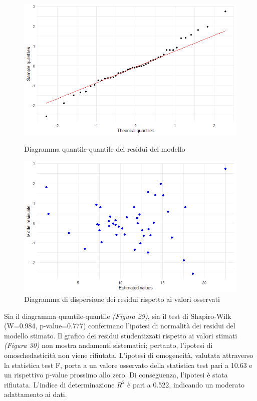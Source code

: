 \documentclass{article} %
\begin{document}
\begin{figure}[H]
    \centering
    \begin{minipage}{0.49\textwidth}
        \centering
        \includegraphics[width=\textwidth]{immagini/qq_lm.png}
        \captionsetup{justification=centering}
        \caption{Diagramma quantile-quantile dei residui del modello}
    \end{minipage}
    \hfill
    \begin{minipage}{0.49\textwidth}
        \centering
        \includegraphics[width=\textwidth]{immagini/res_lm.png}
        \captionsetup{justification=centering}
        \caption{Diagramma di dispersione dei residui rispetto ai valori osservati}
    \end{minipage}
\end{figure}

Sia il diagramma quantile-quantile \textit{(Figura 29)}, sia il test di Shapiro-Wilk (W=0.984, p-value=0.777) confermano l'ipotesi di normalità dei residui del modello stimato. 
Il grafico dei residui studentizzati rispetto ai valori stimati \textit{(Figura 30)} non mostra andamenti sistematici; pertanto, l'ipotesi di omoschedasticità non viene rifiutata. 
L'ipotesi di omogeneità, valutata attraverso la statistica test F, porta a un valore osservato della statistica test pari a 10.63 e un rispettivo p-value prossimo allo zero. Di conseguenza, l'ipotesi è stata rifiutata. 
L'indice di determinazione $R^2$ è pari a 0.522, indicando un moderato adattamento ai dati.
\end{document}
